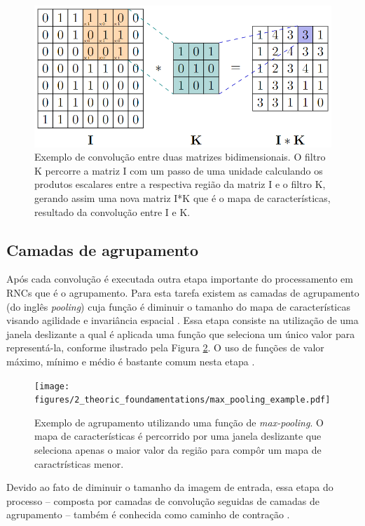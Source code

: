 \begin{figure}[H]
  \centering
  \includegraphics[width=.5\linewidth]{figures/2_theoric_foundamentations/conv2d.png}
  \caption[Exemplo de convolução entre duas matrizes bidimensionais.]{Exemplo de convolução entre duas matrizes bidimensionais. O filtro K percorre a matriz I com um passo de uma unidade calculando os produtos escalares entre a respectiva região da matriz I e o filtro K, gerando assim uma nova matriz I*K que é o mapa de características, resultado da convolução entre I e K.}
  \label{fig:conv2d}
\end{figure}

\subsection{Camadas de agrupamento}

Após cada convolução é executada outra etapa importante do processamento em \ac{RNC}s que é o agrupamento. Para esta tarefa existem as camadas de agrupamento (do inglês \textit{pooling}) cuja função é diminuir o tamanho do mapa de características visando agilidade e invariância espacial \cite{rawat2017deep}. Essa etapa consiste na utilização de uma janela deslizante a qual é aplicada uma função que seleciona um único valor para representá-la, conforme ilustrado pela Figura \ref{fig:pooling}. O uso de funções de valor máximo, mínimo e médio é bastante comum nesta etapa \cite{geron2019maos}.

\begin{figure}[H]
  \centering
  \texttt{[image: figures/2\_theoric\_foundamentations/max\_pooling\_example.pdf]}
  \caption[Agrupamento utilizando uma função de \textit{max-pooling}.]{Exemplo de agrupamento utilizando uma função de \textit{max-pooling}. O mapa de características é percorrido por uma janela deslizante que seleciona apenas o maior valor da região para compôr um mapa de caractrísticas menor.}
  \label{fig:pooling}
\end{figure}

Devido ao fato de diminuir o tamanho da imagem de entrada, essa etapa do processo -- composta por camadas de convolução seguidas de camadas de agrupamento -- também é conhecida como caminho de contração \cite{geron2019maos}.

